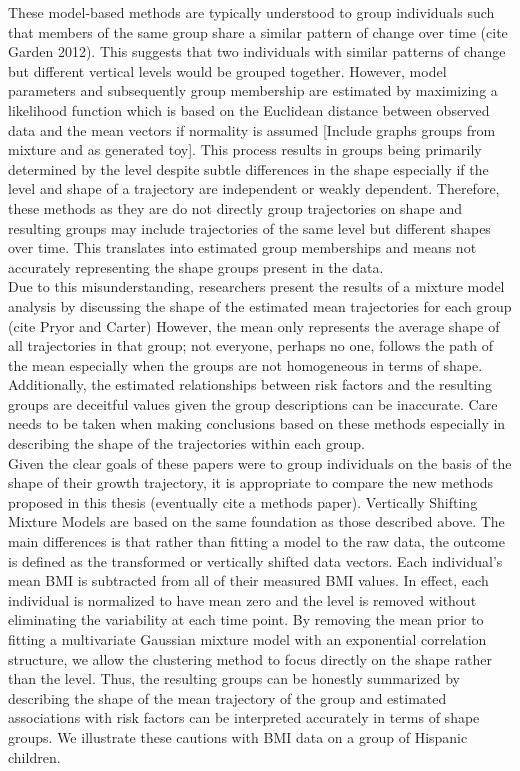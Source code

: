 \documentclass[11pt]{article}
\begin{document}
These model-based methods are typically understood to group individuals such that members of the same group share a similar pattern of change over time (cite Garden 2012). This suggests that two individuals with similar patterns of change but different vertical levels would be grouped together. However, model parameters and subsequently group membership are estimated by maximizing a likelihood function which is based on the Euclidean distance between observed data and the mean vectors if normality is assumed [Include graphs groups from mixture and as generated toy]. This process results in groups being primarily determined by the level despite subtle differences in the shape especially if the level and shape of a trajectory are independent or weakly dependent. Therefore, these methods as they are do not directly group trajectories on shape and resulting groups may include trajectories of the same level but different shapes over time. This translates into estimated group memberships and means not accurately representing the shape groups present in the data.\\

Due to this misunderstanding, researchers present the results of a mixture model analysis by discussing the shape of the estimated mean trajectories for each group (cite Pryor and Carter) However, the mean only represents the average shape of all trajectories in that group; not everyone, perhaps no one, follows the path of the mean especially when the groups are not homogeneous in terms of shape. Additionally, the estimated relationships between risk factors and the resulting groups are deceitful values given the group descriptions can be inaccurate. Care needs to be taken when making conclusions based on these methods especially in describing the shape of the trajectories within each group.  \\

Given the clear goals of these papers were to group individuals on the basis of the shape of their growth trajectory, it is appropriate to compare the new methods proposed in this thesis (eventually cite a methods paper). Vertically Shifting Mixture Models are based on the same foundation as those described above. The main differences is that rather than fitting a model to the raw data, the outcome is defined as the transformed or vertically shifted data vectors. Each individual's mean BMI is subtracted from all of their measured BMI values. In effect, each individual is normalized to have mean zero and the level is removed without eliminating the variability at each time point. By removing the mean prior to fitting a multivariate Gaussian mixture model with an exponential correlation structure, we allow the clustering method to focus directly on the shape rather than the level. Thus, the resulting groups can be honestly summarized by describing the shape of the mean trajectory of the group and estimated associations with risk factors can be interpreted accurately in terms of shape groups. We illustrate these cautions with BMI data on a group of Hispanic children.
\end{document}
